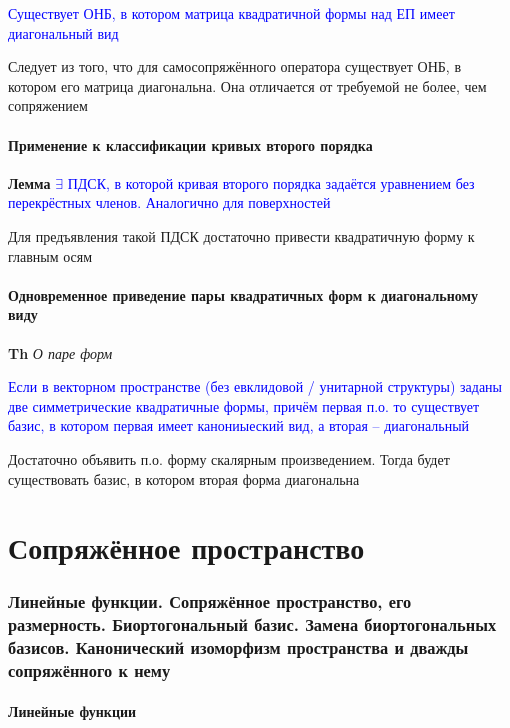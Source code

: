 \documentclass[a4paper, 14pt]{article}
\begin{document}
    \textcolor{blue}{Существует ОНБ, в котором матрица квадратичной формы над ЕП имеет диагональный вид}
    
    Следует из того, что для самосопряжённого оператора существует ОНБ, в котором его матрица диагональна.
    Она отличается от требуемой не более, чем сопряжением
    
    \subsection{Применение к классификации кривых второго порядка}
    
    \textbf{Лемма} \textcolor{blue}{$\exists$ ПДСК, в которой кривая второго порядка задаётся уравнением без
    перекрёстных членов. Аналогично для поверхностей}
    
    Для предъявления такой ПДСК достаточно привести квадратичную форму к главным осям
    
    \subsection{Одновременное приведение пары квадратичных форм к диагональному виду}
    
    \textbf{Th} \textit{О паре форм}
    
    \textcolor{blue}{Если в векторном пространстве (без евклидовой / унитарной структуры) заданы две симметрические
    квадратичные формы, причём первая п.о. то существует базис, в котором первая имеет канониыеский вид, а вторая --
    диагональный}
    
    Достаточно объявить п.о. форму скалярным произведением.
    Тогда будет существовать базис, в котором вторая форма диагональна
    
     \part*{Сопряжённое пространство}
    
    \section{Линейные функции.
    Сопряжённое пространство, его размерность.
    Биортогональный базис.
    Замена биортогональных базисов.
    Канонический изоморфизм пространства и дважды сопряжённого к нему}
    
    \subsection{Линейные функции}
    
\end{document}
